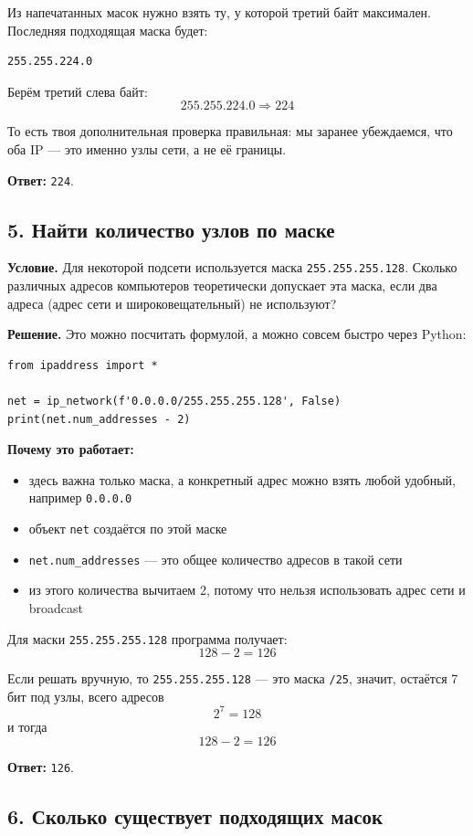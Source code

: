 \documentclass[11pt]{article}
\begin{document}
Из напечатанных масок нужно взять ту, у которой третий байт максимален. Последняя подходящая маска будет:
\begin{verbatim}
255.255.224.0
\end{verbatim}

Берём третий слева байт:
\[
255.255.224.0 \Rightarrow 224
\]

То есть твоя дополнительная проверка правильная: мы заранее убеждаемся, что оба IP --- это именно узлы сети, а не её границы.

\textbf{Ответ:} \texttt{224}.

\subsection*{5. Найти количество узлов по маске}

\textbf{Условие.} Для некоторой подсети используется маска \texttt{255.255.255.128}. Сколько различных адресов компьютеров теоретически допускает эта маска, если два адреса (адрес сети и широковещательный) не используют?

\textbf{Решение.} Это можно посчитать формулой, а можно совсем быстро через Python:
\begin{verbatim}
from ipaddress import *

net = ip_network(f'0.0.0.0/255.255.255.128', False)
print(net.num_addresses - 2)
\end{verbatim}

\textbf{Почему это работает:}
\begin{itemize}
  \item здесь важна только маска, а конкретный адрес можно взять любой удобный, например \texttt{0.0.0.0}
  \item объект \texttt{net} создаётся по этой маске
  \item \texttt{net.num\_addresses} --- это общее количество адресов в такой сети
  \item из этого количества вычитаем 2, потому что нельзя использовать адрес сети и broadcast
\end{itemize}

Для маски \texttt{255.255.255.128} программа получает:
\[
128 - 2 = 126
\]

Если решать вручную, то \texttt{255.255.255.128} --- это маска \texttt{/25}, значит, остаётся 7 бит под узлы, всего адресов
\[
2^7 = 128
\]
и тогда
\[
128 - 2 = 126
\]

\textbf{Ответ:} \texttt{126}.

\subsection*{6. Сколько существует подходящих масок}
\end{document}
